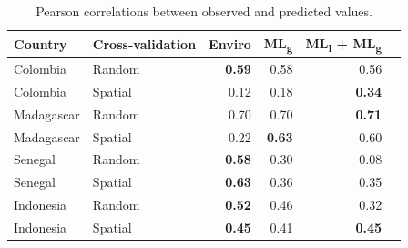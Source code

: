 \documentclass[11pt]{article}
\begin{document}
\begin{table}[t!]
\caption{Pearson correlations between observed and predicted values. }
\centering
\begin{tabular}{llrrrr}
Country &  Cross-validation & Enviro &   ML\textsubscript{g} & ML\textsubscript{l} + ML\textsubscript{g} \\
\hline 
 Colombia & Random &  \textbf{0.59} &0.58 & 0.56 \\
 Colombia &  Spatial &  0.12 &  0.18 & \textbf{0.34}\\
 Madagascar &  Random &  0.70 &  0.70 & \textbf{0.71} \\
 Madagascar &  Spatial &  0.22 &  \textbf{0.63} & 0.60\\
 Senegal &  Random &  \textbf{0.58} &  0.30 & 0.08 \\
 Senegal &  Spatial &  \textbf{0.63} & 0.36 & 0.35 \\
 Indonesia &  Random &  \textbf{0.52} & 0.46 & 0.32 \\
 Indonesia &  Spatial &  \textbf{0.45} & 0.41 & \textbf{0.45} \\
\end{tabular}
\label{t:results2}
\end{table}


\end{document}
